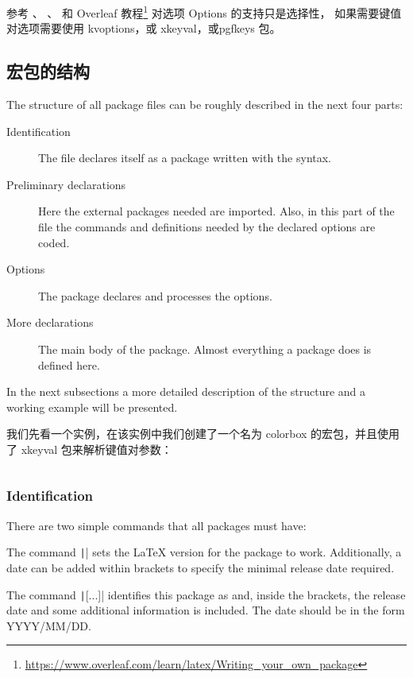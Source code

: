 参考 \cite{CLSGUIDE}、\cite{WIKIBOOKS} 、\cite{COMPANION} 和 Overleaf 教程\footnote{\url{https://www.overleaf.com/learn/latex/Writing_your_own_package}}
{\LaTeXe} 对选项 Options 的支持只是选择性， 如果需要键值对选项需要使用 kvoptions，或 xkeyval，或pgfkeys 包。

\subsection{宏包的结构}

The structure of all package files can be roughly described in the next four parts:

\begin{description}
  \item[Identification] The file declares itself as a package written with the {\LaTeXe} syntax.
  \item[Preliminary declarations] Here the external packages needed are imported. Also, in this part of the file the commands and definitions needed by the declared options are coded.
  \item[Options] The package declares and processes the options.
  \item[More declarations] The main body of the package. Almost everything a package does is defined here.
\end{description}

In the next subsections a more detailed description of the structure and a working example will be presented.

我们先看一个实例，在该实例中我们创建了一个名为 colorbox 的宏包，并且使用了 xkeyval 包来解析键值对参数：

\inputminted{latex}{examples/programming/create-packages.tex}

\subsubsection{Identification}

There are two simple commands that all packages must have:

The command \texttt|| sets the {\LaTeX} version for the package to work. 
Additionally, a date can be added within brackets to specify the minimal release date required.

The command \texttt|[...]| identifies this package as 
 and, inside the brackets, the release date and some additional information 
is included. The date should be in the form YYYY/MM/DD.

